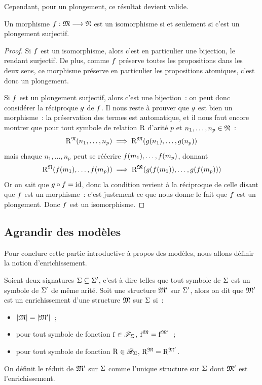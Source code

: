 \noindent
Cependant, pour un plongement, ce résultat devient valide.

\begin{proposition}
  Un morphisme $f : \displaystyle \mathfrak{M} \longrightarrow \mathfrak{N}$ est un isomorphisme si et
  seulement si c'est un plongement surjectif.
\end{proposition}

\begin{proof}
  Si $f$ est un isomorphisme, alors c'est en particulier une bijection,
  le rendant surjectif. De plus, comme $f$ préserve toutes les
  propositions dans les deux sens, ce morphisme préserve en particulier les
  propositions atomiques, c'est donc un plongement.

  Si $f$ est un plongement surjectif, alors c'est une bijection~: on
  peut donc considérer la réciproque $g$ de $f$. Il nous reste à
  prouver que $g$ est bien un morphisme~: la préservation des termes est
  automatique, et il nous faut encore montrer que pour tout symbole de relation
  $\mathrm{R}$ d'arité $p$ et $n_1,\ldots,n_p\in\mathfrak{N}$~:
  \[\mathrm{R}^{\mathfrak{N}}(n_1,\ldots,n_p)\implies
  \mathrm{R}^{\mathfrak{M}}(g(n_1),\ldots,g(n_p))\]
  mais chaque $n_1,\ldots,n_p$ peut se réécrire
  $f(m_1),\ldots,f(m_p)$, donnant
  \[\mathrm{R}^{\mathfrak{N}}(f(m_1),\ldots,f(m_p)) \implies
  \mathrm{R}^{\mathfrak{M}}(g(f(m_1)),\ldots,g(f(m_p)))\]
  Or on sait que $g\circ f = \operatorname{id}$, donc la condition revient à la
  réciproque de celle disant que $f$ est un morphisme~: c'est justement
  ce que nous donne le fait que $f$ est un plongement. Donc $f$ est
  un isomorphisme.
\end{proof}

\subsection{Agrandir des modèles}\label{subsec.enrichissement}

Pour conclure cette partie introductive à propos des modèles, nous allons
définir la notion d'enrichissement.

\begin{definition}[Enrichissement]
  Soient deux signatures $\Sigma\subseteq\Sigma'$, c'est-à-dire telles que tout
  symbole de $\Sigma$ est un symbole de $\Sigma'$ de même arité. Soit une
  structure $\mathfrak{M}'$ sur $\Sigma'$, alors on dit que $\mathfrak{M}'$ est un
  enrichissement d'une structure $\mathfrak{M}$ sur $\Sigma$ si~:
  \begin{itemize}
  \item $\left\vert \mathfrak{M}\right\vert = \left\vert \mathfrak{M}'\right\vert$~;
  \item pour tout symbole de fonction $\mathrm{f}\in \mathscr F_{\Sigma}$,
    $\mathrm{f}^{\mathfrak{M}} = \mathrm{f}^{\mathfrak{M}'}$~;
  \item pour tout symbole de fonction $\mathrm{R}\in \mathscr R_{\Sigma}$,
    $\mathrm{R}^{\mathfrak{M}} = \mathrm{R}^{\mathfrak{M}'}$.
  \end{itemize}

  \noindent
  On définit le réduit de $\mathfrak{M}'$ sur $\Sigma$ comme l'unique
  structure sur $\Sigma$ dont $\mathfrak{M}'$ est l'enrichissement.
\end{definition}

